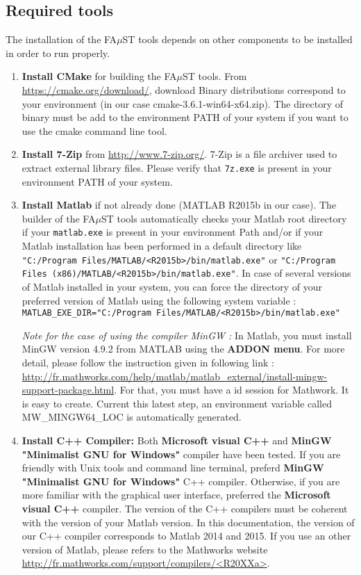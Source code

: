 \subsection{Required tools}\label{sec:WinRequired}
The installation of the FA$\mu$ST tools depends on other components to be installed in order to run properly. 
\begin{enumerate}

\item \textbf{Install CMake} for building the FA$\mu$ST tools. 
From \url{https://cmake.org/download/}, download Binary distributions correspond to your environment (in our case  cmake-3.6.1-win64-x64.zip). The directory of binary must be add to the environment PATH of your system if you want to use the cmake command line tool. 

\item \textbf{Install 7-Zip} from \url{http://www.7-zip.org/}. 7-Zip is a file archiver used to extract external library files. Please verify that \texttt{7z.exe} is present in your environment PATH of your system.

\item \textbf{Install Matlab} if not already done (MATLAB R2015b in our case). The builder of the FA$\mu$ST tools automatically checks your Matlab root directory if your \texttt{matlab.exe} is present in your environment Path and/or if your Matlab installation has been performed in a default directory like \texttt{"C:/Program Files/MATLAB/<R2015b>/bin/matlab.exe"} or \texttt{"C:/Program Files (x86)/MATLAB/<R2015b>/bin/matlab.exe"}. In case of several versions of Matlab installed in your system, you can force the directory of your preferred version of Matlab using the following system variable : \\
\texttt{MATLAB\_EXE\_DIR="C:/Program Files/MATLAB/<R2015b>/bin/matlab.exe"}

\textit{Note for the case of using the compiler MinGW :} In Matlab, you must install MinGW version 4.9.2 from MATLAB using the \textbf{ADDON menu}. For more detail, please follow the instruction given in following link :  
\url{http://fr.mathworks.com/help/matlab/matlab_external/install-mingw-support-package.html}. For that, you must have a id session for Mathwork. It is easy to create. 
Current this latest step, an environment variable called MW\_MINGW64\_LOC is automatically generated. 

\item \textbf{Install C++ Compiler:} Both \textbf{Microsoft visual C++} and \textbf{MinGW "Minimalist GNU for Windows"} compiler have been tested. If you are friendly with Unix tools and command line terminal, preferd \textbf{MinGW "Minimalist GNU for Windows"} C++ compiler. Otherwise, if you are more familiar with the graphical user interface, preferred the \textbf{Microsoft visual C++} compiler. The version of the C++ compilers must be coherent with the version of your Matlab version. In this documentation, the version of our C++ compiler corresponds to Matlab 2014 and 2015. If you use an other version of Matlab, please refers to the Mathworks website \url{http://fr.mathworks.com/support/compilers/<R20XXa>}.


\end{enumerate}
